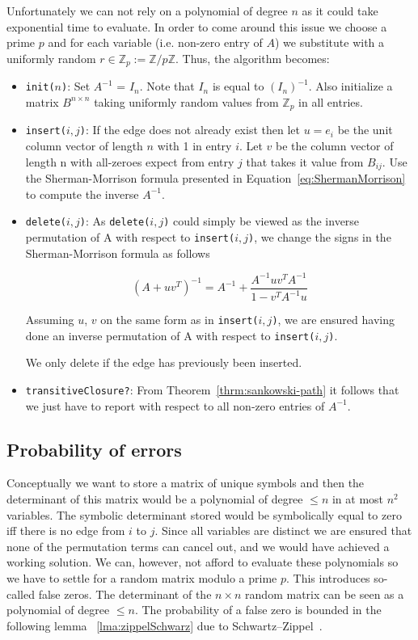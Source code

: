 \documentclass[a4paper,oneside,article,11pt]{memoir}
\begin{document}
Unfortunately we can not rely on a polynomial of degree $n$ as it could take exponential time to evaluate. In order to come around this issue we choose a prime $p$ and for each variable (i.e. non-zero entry of $A$) we substitute with a uniformly random $r \in \mathbb{Z}_{p} := \mathbb{Z} / p\mathbb{Z}$. Thus, the algorithm becomes:

\begin{itemize}
\item{\texttt{init($n$)}: Set $A^{-1}$ = $I_n$. Note that $I_n$ is equal to $(I_n)^{-1}$. Also  initialize a matrix $B^{n \times n}$ taking uniformly random values from $\mathbb{Z}_p$ in all entries.}
\item{\texttt{insert($i,j$)}: If the edge does not already exist then let $u = e_i$ be the unit column vector of length $n$ with 1 in entry $i$. Let $v$ be the column vector of length n with all-zeroes expect from entry $j$ that takes it value from $B_{ij}$.
Use the Sherman-Morrison formula presented in Equation~\ref{eq:ShermanMorrison} to compute the inverse $A^{-1}$.}
\item{\texttt{delete($i,j$)}: As \texttt{delete($i,j$)} could simply be viewed as the inverse permutation of A with respect to \texttt{insert($i,j$)}, we change the signs in the Sherman-Morrison formula as follows

$$(A+uv^T)^{-1} = A^{-1} + \dfrac{A^{-1}uv^TA^{-1}}{1 - v^T A^{-1} u}$$

Assuming $u$, $v$ on the same form as in \texttt{insert($i,j$)}, we are ensured having done an inverse permutation of A with respect to \texttt{insert($i,j$)}.

We only delete if the edge has previously been inserted.
}

\item{\texttt{transitiveClosure?}: From Theorem~\ref{thrm:sankowski-path} it follows that we just have to report with respect to all non-zero entries of $A^{-1}$.}
\end{itemize}

\subsection{Probability of errors}

Conceptually we want to store a matrix of unique symbols and then the determinant of this matrix would be a polynomial of degree $\leq n$ in at most $n^2$ variables. The symbolic determinant stored would be symbolically equal to zero iff there is no edge from $i$ to $j$. Since all variables are distinct we are ensured that none of the permutation terms can cancel out, and we would have achieved a working solution. We can, however, not afford to evaluate these polynomials so we have to settle for a random matrix modulo a prime $p$.
This introduces so-called false zeros. The determinant of the $n \times n$ random matrix can be seen as a polynomial of degree $\leq n$. The probability of a false zero is bounded in the following lemma ~\ref{lma:zippelSchwarz} due to Schwartz–Zippel~\cite{Reif1997347}.
\end{document}
